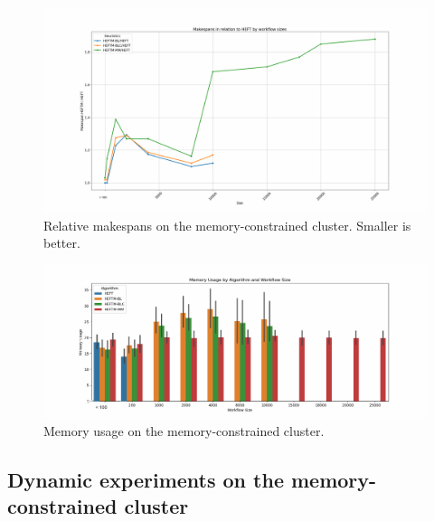 \documentclass[conference]{IEEEtran}
\begin{document}
    \begin{figure}[tb]
        \centering
        \includegraphics[width=1\columnwidth] {images/makespan_relations_by_wf_size-constrained}
        \caption{Relative makespans on the memory-constrained cluster.
        Smaller is better.}
        \label{fig:ms-relations-by-workflow-constrained}
        \vspace{-0.3cm}
    \end{figure}


    \begin{figure}[tb]
        \centering
        \includegraphics[width=1.1\columnwidth] {images/mem-usage-constrained-onlyvalid}
        \caption{Memory usage on the memory-constrained  cluster. } %
        \label{fig:memory-usage-constrained}
        \vspace{-0.3cm}
    \end{figure}


    
\subsection{Dynamic experiments on the memory-constrained cluster}
\label{sec.expe.dyn}
\end{document}
